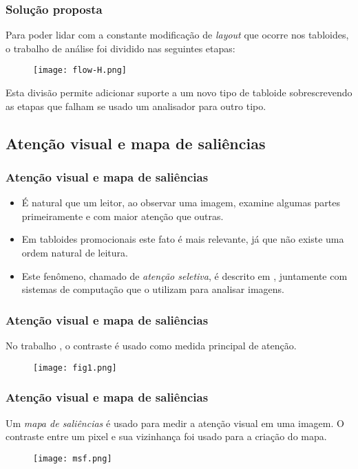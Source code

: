 \documentclass{beamer}
\begin{document}
\begin{frame}
    \frametitle{Solução proposta}
    Para poder lidar com a constante modificação de \emph{layout} que ocorre nos tabloides, o trabalho de análise foi dividido nas seguintes etapas:
    \pause
    \begin{figure}[!ht]
    \begin{center}
        \texttt{[image: flow-H.png]}
    \end{center}
    \end{figure}
    \pause
    Esta divisão permite adicionar suporte a um novo tipo de tabloide sobrescrevendo as etapas que falham se usado um analisador para outro tipo.
\end{frame}



\subsection{Atenção visual e mapa de saliências}

\begin{frame}
\frametitle{Atenção visual e mapa de saliências}
	\begin{itemize}
	    \item É natural que um leitor, ao observar uma imagem, examine algumas partes primeiramente e com maior atenção que outras. \pause 
	    \item Em tabloides promocionais este fato é mais relevante, já que não existe uma ordem natural de leitura. \pause
	    \item Este fenômeno, chamado de \emph{atenção seletiva}, é descrito em \cite{survey10}, juntamente com sistemas de computação que o utilizam para analisar imagens.
    \end{itemize}
\end{frame}

\begin{frame}
\frametitle{Atenção visual e mapa de saliências}
No trabalho \cite{Ma e Zhang03}, o contraste é usado como medida principal de atenção.

\begin{figure}[!ht]
    \begin{center}
        \texttt{[image: fig1.png]}
    \end{center}
\end{figure}
\end{frame}

\begin{frame}
\frametitle{Atenção visual e mapa de saliências}
Um \emph{mapa de saliências} é usado para medir a atenção visual em uma imagem. O contraste entre um pixel e sua vizinhança foi usado para a criação do mapa.


\begin{figure}[!ht]
    \begin{center}
        \texttt{[image: msf.png]}
    \end{center}
\end{figure}
\end{frame}
\end{document}
